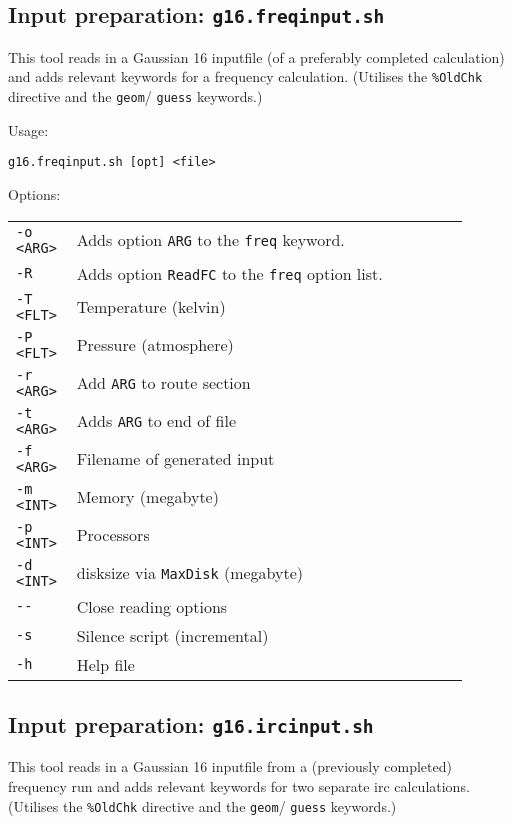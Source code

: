 \documentclass[   %
  final,          %
  a4paper         %
]{article}
\begin{document}
\subsection{Input preparation: \texorpdfstring{{\lstinline`g16.freqinput.sh`}}{g16.freqinput.sh}}

This tool reads in a Gaussian 16 inputfile (of a preferably completed calculation)
and adds relevant keywords for a frequency calculation.
(Utilises the \texttt{\%OldChk} directive and the \texttt{geom}/ \texttt{guess} keywords.)

Usage: 

\lstinline`g16.freqinput.sh [opt] <file>`

Options:

\begin{tabular}{p{0.1\linewidth}p{0.8\linewidth}}
  {\lstinline`-o <ARG>`} & Adds option {\lstinline`ARG`} to the \texttt{freq} keyword. \\
  {\lstinline`-R`}       & Adds option \texttt{ReadFC} to the \texttt{freq} option list. \\
  {\lstinline`-T <FLT>`} & Temperature (kelvin) \\
  {\lstinline`-P <FLT>`} & Pressure (atmosphere) \\
  {\lstinline`-r <ARG>`} & Add {\lstinline`ARG`} to route section \\
  {\lstinline`-t <ARG>`} & Adds {\lstinline`ARG`} to end of file \\
  {\lstinline`-f <ARG>`} & Filename of generated input \\
  {\lstinline`-m <INT>`} & Memory (megabyte) \\
  {\lstinline`-p <INT>`} & Processors \\
  {\lstinline`-d <INT>`} & disksize via \texttt{MaxDisk} (megabyte) \\
  {\lstinline`--`}       & Close reading options \\
  {\lstinline`-s`}       & Silence script (incremental) \\
  {\lstinline`-h`}       & Help file  \\
\end{tabular}

\subsection{Input preparation: \texorpdfstring{{\lstinline`g16.ircinput.sh`}}{g16.ircinput.sh}}

This tool reads in a Gaussian 16 inputfile from a (previously completed) frequency run and 
adds relevant keywords for two separate irc calculations.
(Utilises the \texttt{\%OldChk} directive and the \texttt{geom}/ \texttt{guess} keywords.)
\end{document}
